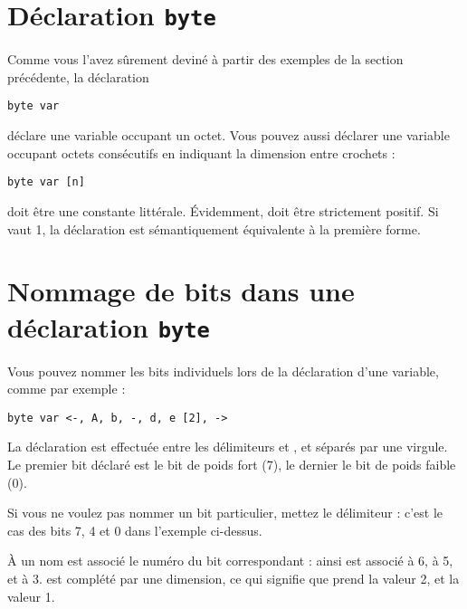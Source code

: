 \section{Déclaration \texttt{byte}}

Comme vous l'avez sûrement deviné à partir des exemples de la section précédente, la déclaration

\begin{lstlisting}[language=piccolo]
byte var 
\end{lstlisting}

déclare une variable  occupant un octet. Vous pouvez aussi déclarer une variable occupant  octets consécutifs en indiquant la dimension entre crochets :

\begin{lstlisting}[language=piccolo]
byte var [n]
\end{lstlisting}

 doit être une constante littérale. Évidemment,  doit être strictement positif. Si  vaut 1, la déclaration est sémantiquement équivalente à la première forme.






\section{Nommage de bits dans une déclaration \texttt{byte}}

Vous pouvez nommer les bits individuels lors de la déclaration d'une variable, comme par exemple :

\begin{lstlisting}[language=piccolo]
byte var <-, A, b, -, d, e [2], ->
\end{lstlisting}

La déclaration est effectuée entre les délimiteurs \piccolo{<} et \piccolo{>}, et séparés par une virgule. Le premier bit déclaré est le bit de poids fort (7), le dernier le bit de poids faible (0).

Si vous ne voulez pas nommer un bit particulier, mettez le délimiteur \piccolo{-} : c'est le cas des bits 7, 4 et 0 dans l'exemple ci-dessus.

À un nom est associé le numéro du bit correspondant : ainsi  est associé à 6,  à 5, et  à 3.  est complété par une dimension, ce qui signifie que  prend la valeur 2, et  la valeur 1.

